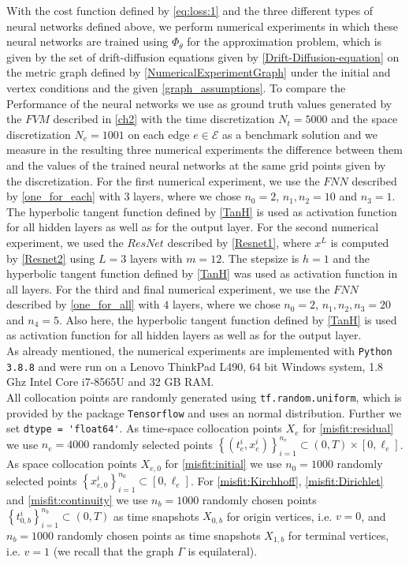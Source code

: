 With the cost function defined by \cref{eq:loss:1} and the three different types of neural networks defined above, we perform numerical experiments in which these neural networks are trained using $\Phi_{\theta}$ for the approximation problem, which is given by the set of drift-diffusion equations given by \cref{Drift-Diffusion-equation} on the metric graph defined by \cref{NumericalExperimentGraph} under the initial and vertex conditions and the given \cref{graph_assumptions}. To compare the Performance of the neural networks we use as ground truth values generated by the $FVM$ described in \cref{ch2} with the time discretization $N_t = 5000$ and the space discretization $N_e = 1001$ on each edge $e \in \mathcal{E}$ as a benchmark solution and we measure in the resulting three numerical experiments the difference between them and the values of the trained neural networks at the same grid points given by the discretization. For the first numerical experiment, we use the $FNN$ described by \cref{one_for_each} with $3$ layers, where we chose $n_0 = 2$, $n_1, n_2 = 10$ and $n_3 = 1$. The hyperbolic tangent function defined by \cref{TanH} is used as activation function for all hidden layers as well as for the output layer. For the second numerical experiment, we used the $ResNet$ described by \cref{Resnet1}, where $x^L$ is computed by \cref{Resnet2} using $L = 3$ layers with $m = 12$. The stepsize is $h=1$ and the hyperbolic tangent function defined by \cref{TanH} was used as activation function in all layers. For the third and final numerical experiment, we use the $FNN$ described by \cref{one_for_all} with $4$ layers, where we chose $n_0 = 2$, $n_1, n_2, n_3 = 20$ and $n_4 = 5$. Also here, the hyperbolic tangent function defined by \cref{TanH} is used as activation function for all hidden layers as well as for the output layer. \\
As already mentioned, the numerical experiments are implemented with \lstinline!Python 3.8.8! and were run on a Lenovo ThinkPad L490, 64 bit Windows system, 1.8 Ghz Intel Core i7-8565U and 32 GB RAM. \\
All collocation points are randomly generated using \lstinline!tf.random.uniform!, which is provided by the package \lstinline!Tensorflow! and uses an normal distribution. Further we set \lstinline!dtype = 'float64'!. As time-space collocation points $X_e$ for \cref{misfit:residual} we use $n_e = 4000$ randomly selected points $\left\{ \left( t_e^i, x_e^i \right) \right\}_{i=1}^{n_e} \subset \left( 0, T \right) \times \left[0, \ell_e\right]$. As space collocation points $X_{e,0}$ for \cref{misfit:initial} we use $n_0 = 1000$ randomly selected points $ \left\{ x_{e,0}^i \right\}_{i=1}^{n_0} \subset \left[0, \ell_e\right]$. For \cref{misfit:Kirchhoff}, \cref{misfit:Dirichlet} and \cref{misfit:continuity} we use $n_b = 1000$ randomly chosen points $\left\{ t_{0,b}^i \right\}_{i=1}^{n_b} \subset \left( 0,T \right)$ as time snapshots $X_{0,b}$ for origin vertices, i.e. $v = 0$, and $n_b = 1000$ randomly chosen points as time snapshots $X_{1,b}$ for terminal vertices, i.e. $v = 1$ (we recall that the graph $\Gamma$ is equilateral). \\
